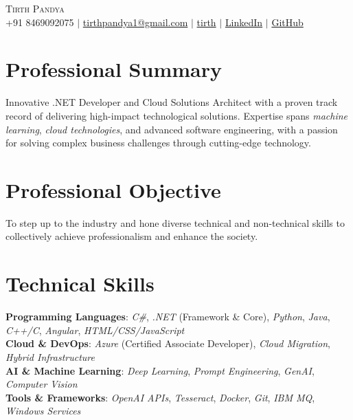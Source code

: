 \documentclass[letterpaper,11pt]{article}
\begin{document}
\begin{center}
    {\Huge \scshape Tirth Pandya} \\ \vspace{1pt}
    \small
    \faMobile \hspace{.5pt} +91 8469092075
    $|$
    \faEnvelope \hspace{.5pt} \href{mailto:tirthpandya1@gmail.com}{tirthpandya1@gmail.com}
    $|$
    \faInstagram \hspace{.5pt} \href{https://www.instagram.com/tirth_6}{tirth}
    $|$
    \faLinkedin \hspace{.5pt} \href{https://www.linkedin.com/in/tirth-pandya-33b841143}{LinkedIn}
    $|$
    \faGithub \hspace{.5pt} \href{https://github.com/tirthpandya1}{GitHub}
    
\end{center}

\section{Professional Summary}
Innovative .NET Developer and Cloud Solutions Architect with a proven track record of delivering high-impact technological solutions. Expertise spans \textit{machine learning}, \textit{cloud technologies}, and advanced software engineering, with a passion for solving complex business challenges through cutting-edge technology.

\section{Professional Objective}
To step up to the industry and hone diverse technical and non-technical skills to collectively achieve professionalism and enhance the society.

\section{Technical Skills}
\begin{itemize}[leftmargin=0.15in, label={}]
    \small{\item{
        \textbf{Programming Languages}{: \textit{C\#}, \textit{.NET} (Framework \& Core), \textit{Python}, \textit{Java}, \textit{C++/C}, \textit{Angular}, \textit{HTML/CSS/JavaScript}} \\
        \textbf{Cloud \& DevOps}{: \textit{Azure} (Certified Associate Developer), \textit{Cloud Migration}, \textit{Hybrid Infrastructure}} \\
        \textbf{AI \& Machine Learning}{: \textit{Deep Learning}, \textit{Prompt Engineering}, \textit{GenAI}, \textit{Computer Vision}} \\
        \textbf{Tools \& Frameworks}{: \textit{OpenAI APIs}, \textit{Tesseract}, \textit{Docker}, \textit{Git}, \textit{IBM MQ}, \textit{Windows Services}}
    }}
\end{itemize}
\end{document}
